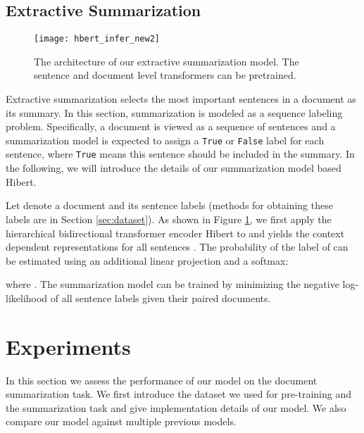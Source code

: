 \documentclass[11pt,a4paper]{article}
\begin{document}
\subsection{Extractive Summarization}
\label{sec:sum}
\begin{figure}[t]
	\centering
	\texttt{[image: hbert\_infer\_new2]}
	\caption{The architecture of our extractive summarization model. The sentence and document level transformers can be pretrained.}
	\label{fig:sum}
\end{figure}

Extractive summarization selects the most important sentences in a document as its summary. In this section, summarization is modeled as a sequence labeling problem. Specifically, a document is viewed as a sequence of sentences and a summarization model is expected to assign a {\tt True} or {\tt False} label for each sentence, where {\tt True} means this sentence should be included in the summary. In the following, we will introduce the details of our summarization model based \mbox{{\sc Hibert}}.

Let  denote a document and  its sentence labels (methods for obtaining these labels are in Section \ref{sec:dataset}). 
As shown in Figure \ref{fig:sum}, we first apply the hierarchical bidirectional transformer encoder \mbox{{\sc Hibert}} to  and yields the context dependent representations for all sentences . The probability of the label of  can be estimated using an additional linear projection and a softmax:

where . The summarization model can be trained by minimizing the negative log-likelihood of all sentence labels given their paired documents.


\section{Experiments}
In this section we assess the performance of our model on the document summarization task. We first introduce the dataset we used for pre-training and the summarization task and give implementation details of our model. We also compare our model against multiple previous models.
\end{document}
